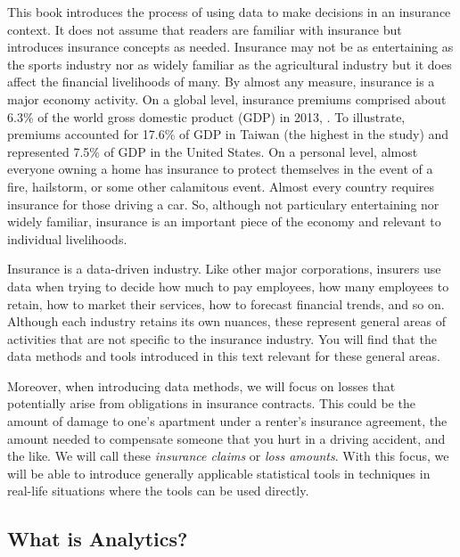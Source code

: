 \documentclass[]{book}
\theoremstyle{definition}
\theoremstyle{definition}
\theoremstyle{definition}
\theoremstyle{remark}
\begin{document}
This book introduces the process of using data to make decisions in an
insurance context. It does not assume that readers are familiar with
insurance but introduces insurance concepts as needed. Insurance may not
be as entertaining as the sports industry nor as widely familiar as the
agricultural industry but it does affect the financial livelihoods of
many. By almost any measure, insurance is a major economy activity. On a
global level, insurance premiums comprised about 6.3\% of the world
gross domestic product (GDP) in 2013, \citep{III2015}. To illustrate,
premiums accounted for 17.6\% of GDP in Taiwan (the highest in the
study) and represented 7.5\% of GDP in the United States. On a personal
level, almost everyone owning a home has insurance to protect themselves
in the event of a fire, hailstorm, or some other calamitous event.
Almost every country requires insurance for those driving a car. So,
although not particulary entertaining nor widely familiar, insurance is
an important piece of the economy and relevant to individual
livelihoods.

Insurance is a data-driven industry. Like other major corporations,
insurers use data when trying to decide how much to pay employees, how
many employees to retain, how to market their services, how to forecast
financial trends, and so on. Although each industry retains its own
nuances, these represent general areas of activities that are not
specific to the insurance industry. You will find that the data methods
and tools introduced in this text relevant for these general areas.

Moreover, when introducing data methods, we will focus on losses that
potentially arise from obligations in insurance contracts. This could be
the amount of damage to one's apartment under a renter's insurance
agreement, the amount needed to compensate someone that you hurt in a
driving accident, and the like. We will call these \emph{insurance
claims} or \emph{loss amounts}. With this focus, we will be able to
introduce generally applicable statistical tools in techniques in
real-life situations where the tools can be used directly.

\subsection{What is Analytics?}\label{what-is-analytics}
\end{document}
